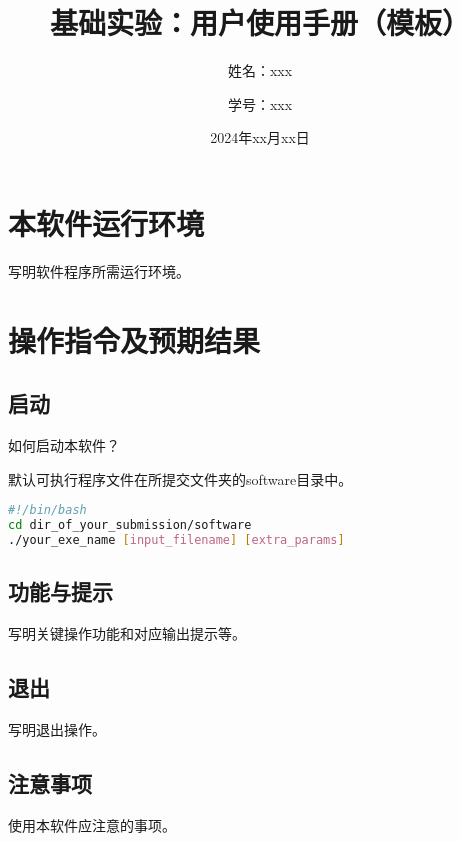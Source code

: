 \documentclass[12pt]{article}
\begin{document}
\renewcommand{\labelitemii}{$\circ$} %


\setlength{\droptitle}{-3cm}
\title{基础实验：用户使用手册（模板）}
\author{姓名：xxx \and 学号：xxx}
\date{2024年xx月xx日}
\maketitle




\section{本软件运行环境}

写明软件程序所需运行环境。


\section{操作指令及预期结果}

\subsection{启动}

如何启动本软件？

默认可执行程序文件在所提交文件夹的software目录中。


\begin{lstlisting}[language=bash,caption={Launch the software in the terminal}]
#!/bin/bash
cd dir_of_your_submission/software 
./your_exe_name [input_filename] [extra_params]
\end{lstlisting}


\subsection{功能与提示}

写明关键操作功能和对应输出提示等。

\subsection{退出}

写明退出操作。

\subsection{注意事项}

使用本软件应注意的事项。

 
\end{document}
